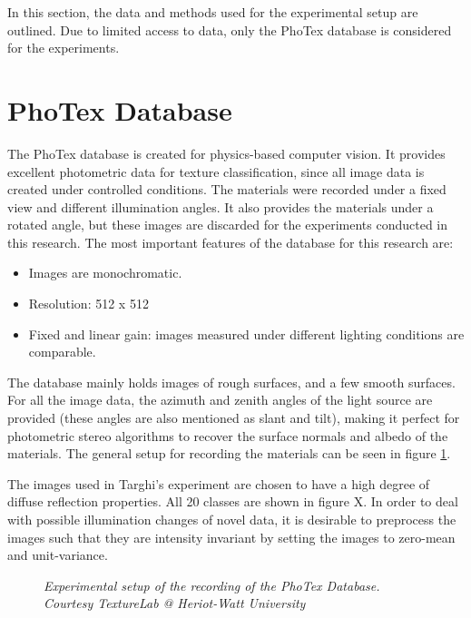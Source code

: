 \hypertarget{Approach}{
}
In this section, the data and methods used for the experimental setup are outlined. Due to limited access to data, only the PhoTex database is considered for the experiments. 

\section{PhoTex Database}\label{sec:PhoTex}
The PhoTex database is created for physics-based computer vision. It provides excellent photometric data for texture classification, since all image data is  created under controlled conditions. The materials were recorded under a fixed view and different illumination angles. It also provides the materials under a rotated angle, but these images are discarded for the experiments conducted in this research. The most important features of the database for this research are:
\begin{itemize}
	\item Images are monochromatic.
	\item Resolution: 512 x 512
	\item Fixed and linear gain: images measured under different lighting conditions are comparable. 
\end{itemize}

\noindent The database mainly holds images of rough surfaces, and a few smooth surfaces. For all the image data, the azimuth and zenith angles of the light source are provided (these angles are also mentioned as slant and tilt), making it perfect for photometric stereo algorithms to recover the surface normals and albedo of the materials. The general setup for recording the materials can be seen in figure \ref{fig:PHOTEX_SETUP}. 

The images used in Targhi's experiment are chosen to have a high degree of diffuse reflection properties. All 20 classes are shown in figure X. In order to deal with possible illumination changes of novel data, it is desirable to preprocess the images such that they are intensity invariant by setting the images to zero-mean and unit-variance. 


\begin{figure}[t]
	\begin{center}
	\end{center}
	\caption{\textit{Experimental setup of the recording of the PhoTex Database. Courtesy TextureLab @ Heriot-Watt University}}
	\label{fig:PHOTEX_SETUP}
\end{figure}



